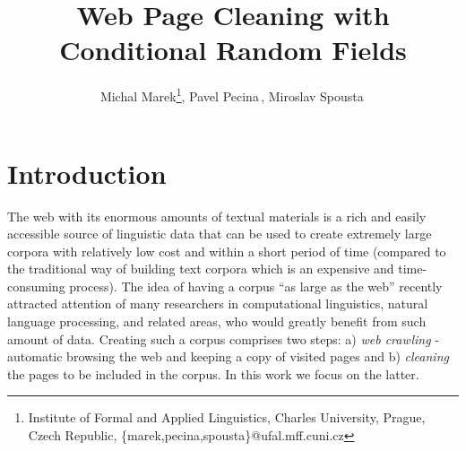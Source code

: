 \documentclass[12pt,a4paper, fleqn, leqno, twoside]{article}
\begin{document}
\title{Web Page Cleaning with Conditional Random Fields}

\author{Michal Marek\footnote{Institute of Formal and Applied Linguistics, Charles University, Prague, Czech Republic, \{marek,pecina,spousta\}@ufal.mff.cuni.cz},
Pavel Pecina\,\footnotemark[1], Miroslav Spousta\,\footnotemark[1] }

\maketitle



\selectnormalfont


\section{Introduction}

The web with its enormous amounts of textual materials is a rich and easily accessible source of linguistic data that can be used to create extremely large corpora with relatively low cost and within a short period of time (compared to the traditional way of building text corpora which is an expensive and time-consuming process). The idea of having a corpus ``as large as the web'' recently attracted attention of many researchers in computational linguistics, natural language processing, and related areas, who would greatly benefit from such amount of data. Creating such a corpus comprises two steps: a) \textit{web crawling} - automatic browsing the web and keeping a copy of visited pages and b) \textit{cleaning} the pages to be included in the corpus. In this work we focus on the latter.
\end{document}
